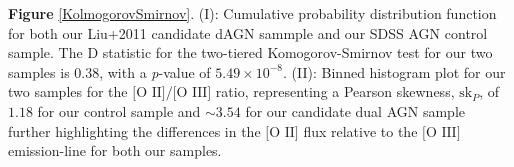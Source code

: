 \label{KolmogorovSmirnov} \textbf{Figure} \ref{KolmogorovSmirnov}. (I): Cumulative probability distribution function for both our Liu+2011 candidate dAGN sammple and our SDSS AGN control sample. The D statistic for the two-tiered Komogorov-Smirnov test for our two samples is 0.38, with a \textit{p}-value of $5.49\times10^{-8}$. (II): Binned histogram plot for our two samples for the $\text{[O II]}/\text{[O III]}$ ratio, representing a Pearson skewness, $\text{sk}_{P}$, of $1.18$ for our control sample and $\sim{3.54}$ for our candidate dual AGN sample further highlighting the differences in the $\text{[O II]}$ flux relative to the $\text{[O III]}$ emission-line for both our samples.
  
  
  